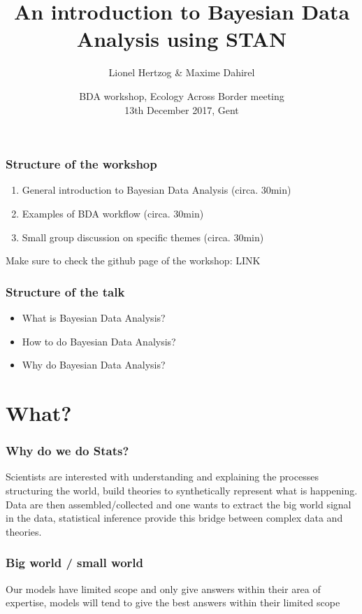 \documentclass{beamer}
\title{An introduction to Bayesian Data Analysis using STAN}
\subtitle{}
\author{Lionel Hertzog \& Maxime Dahirel}
\date{BDA workshop, Ecology Across Border meeting\\ 13th December 2017, Gent}
\begin{document}
 
 \frame{\titlepage}
 

\begin{frame}
 \frametitle{\bf Structure of the workshop}
  \begin{enumerate}
   \item General introduction to Bayesian Data Analysis (circa. 30min)
   \item Examples of BDA workflow (circa. 30min)
   \item Small group discussion on specific themes (circa. 30min)
  \end{enumerate}
  
  Make sure to check the github page of the workshop: LINK

 
 \end{frame}
 
\begin{frame}
 \frametitle{\bf Structure of the talk}
  \begin{itemize}
   \item What is Bayesian Data Analysis?
   \item How to do Bayesian Data Analysis?
   \item Why do Bayesian Data Analysis?
  \end{itemize}

 
 \end{frame} 
 
 
\section*{What?} 
 
 \begin{frame}
  \frametitle{\bf Why do we do Stats?}
  
  Scientists are interested with understanding and explaining the processes structuring the world, build theories to synthetically represent what is happening.
  Data are then assembled/collected and one wants to extract the big world signal in the data, statistical inference provide this bridge between complex data and
  theories. 
  
  
  
 \end{frame}

  \begin{frame}
  \frametitle{\bf Big world / small world}
  
  Our models have limited scope and only give answers within their area of expertise, models will tend to give the best answers within their limited scope  
  
 \end{frame}
 
\end{document}

